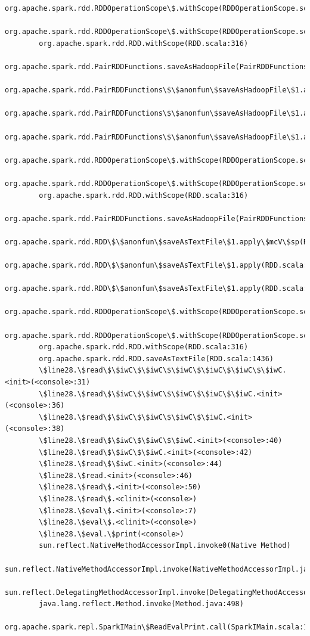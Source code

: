 \documentclass[11pt]{article}
\begin{document}
\begin{Verbatim}[commandchars=\\\{\}]
        org.apache.spark.rdd.RDDOperationScope\$.withScope(RDDOperationScope.scala:150)
        org.apache.spark.rdd.RDDOperationScope\$.withScope(RDDOperationScope.scala:111)
        org.apache.spark.rdd.RDD.withScope(RDD.scala:316)
        org.apache.spark.rdd.PairRDDFunctions.saveAsHadoopFile(PairRDDFunctions.scala:1026)
        org.apache.spark.rdd.PairRDDFunctions\$\$anonfun\$saveAsHadoopFile\$1.apply\$mcV\$sp(PairRDDFunctions.scala:952)
        org.apache.spark.rdd.PairRDDFunctions\$\$anonfun\$saveAsHadoopFile\$1.apply(PairRDDFunctions.scala:952)
        org.apache.spark.rdd.PairRDDFunctions\$\$anonfun\$saveAsHadoopFile\$1.apply(PairRDDFunctions.scala:952)
        org.apache.spark.rdd.RDDOperationScope\$.withScope(RDDOperationScope.scala:150)
        org.apache.spark.rdd.RDDOperationScope\$.withScope(RDDOperationScope.scala:111)
        org.apache.spark.rdd.RDD.withScope(RDD.scala:316)
        org.apache.spark.rdd.PairRDDFunctions.saveAsHadoopFile(PairRDDFunctions.scala:951)
        org.apache.spark.rdd.RDD\$\$anonfun\$saveAsTextFile\$1.apply\$mcV\$sp(RDD.scala:1457)
        org.apache.spark.rdd.RDD\$\$anonfun\$saveAsTextFile\$1.apply(RDD.scala:1436)
        org.apache.spark.rdd.RDD\$\$anonfun\$saveAsTextFile\$1.apply(RDD.scala:1436)
        org.apache.spark.rdd.RDDOperationScope\$.withScope(RDDOperationScope.scala:150)
        org.apache.spark.rdd.RDDOperationScope\$.withScope(RDDOperationScope.scala:111)
        org.apache.spark.rdd.RDD.withScope(RDD.scala:316)
        org.apache.spark.rdd.RDD.saveAsTextFile(RDD.scala:1436)
        \$line28.\$read\$\$iwC\$\$iwC\$\$iwC\$\$iwC\$\$iwC\$\$iwC.<init>(<console>:31)
        \$line28.\$read\$\$iwC\$\$iwC\$\$iwC\$\$iwC\$\$iwC.<init>(<console>:36)
        \$line28.\$read\$\$iwC\$\$iwC\$\$iwC\$\$iwC.<init>(<console>:38)
        \$line28.\$read\$\$iwC\$\$iwC\$\$iwC.<init>(<console>:40)
        \$line28.\$read\$\$iwC\$\$iwC.<init>(<console>:42)
        \$line28.\$read\$\$iwC.<init>(<console>:44)
        \$line28.\$read.<init>(<console>:46)
        \$line28.\$read\$.<init>(<console>:50)
        \$line28.\$read\$.<clinit>(<console>)
        \$line28.\$eval\$.<init>(<console>:7)
        \$line28.\$eval\$.<clinit>(<console>)
        \$line28.\$eval.\$print(<console>)
        sun.reflect.NativeMethodAccessorImpl.invoke0(Native Method)
        sun.reflect.NativeMethodAccessorImpl.invoke(NativeMethodAccessorImpl.java:62)
        sun.reflect.DelegatingMethodAccessorImpl.invoke(DelegatingMethodAccessorImpl.java:43)
        java.lang.reflect.Method.invoke(Method.java:498)
        org.apache.spark.repl.SparkIMain\$ReadEvalPrint.call(SparkIMain.scala:1065)

\end{Verbatim}
\end{document}
